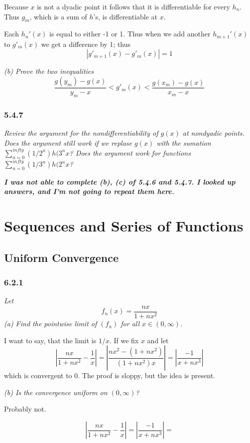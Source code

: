 \documentclass[11pt,oneside,titlepage]{book}
\begin{document}
Because $x$ is not a dyadic point it follows that it is differentiable for
every $h_n$. Thus $g_m$, which is a sum of $h$'s, is differentiable at $x$.

Each $h_n'(x)$ is equal to either -1 or 1. Thus when we add another
$h_{m + 1}'(x)$ to $g'_m(x)$ we get a difference by 1; thus
$$|g'_{m + 1}(x) - g'_m(x)| = 1$$

\textit{(b) Prove the two inequalities}
$$\frac{g(y_m) - g(x)}{y_m - x} < g'_m(x) < \frac{g(x_m) - g(x)}{x_m - x}$$

\subsection*{5.4.7}
\textit{Review the argument for the nondifferentiability of $g(x)$ at
  nondyadic points. Does the argument still work if we replase $g(x)$ with
  the sumation $\sum_{n =0}^{infty}{(1/2^n)h(3^n x}$? Does the argument work
  for functions $\sum_{n =0}^{infty}{(1/3^n)h(2^n x}$?}


\textbf{\textit{I was not able to complete (b), (c) of 5.4.6 and 5.4.7.
    I looked up answers, and I'm not going to repeat them here.}}

\chapter{Sequences and Series of Functions}

\section{Uniform Convergence}

\subsection*{6.2.1}
\textit{Let}
$$f_n(x) = \frac{nx}{1 + nx^2}$$
\textit{(a) Find the pointwise limit of $(f_n)$ for all $x \in (0, \infty)$.}

I want to say, that the limit is $1/x$. If we fix $x$ and
let
$$\left|\frac{nx}{1 + nx^2} - \frac{1}{x}\right| =
\left|\frac{nx^2 - (1 + nx^2)}{(1 + nx^2)x} \right| =
\left|\frac{-1}{x + nx^3} \right|
$$
which is convergent to 0. The proof is sloppy, but the idea is present.

\textit{(b) Is the convergence uniform on $(0, \infty)$?}

Probably not.

$$\left|\frac{nx}{1 + nx^2} - \frac{1}{x}\right| =
\left|\frac{-1}{x + nx^3} \right| =
$$
\end{document}
